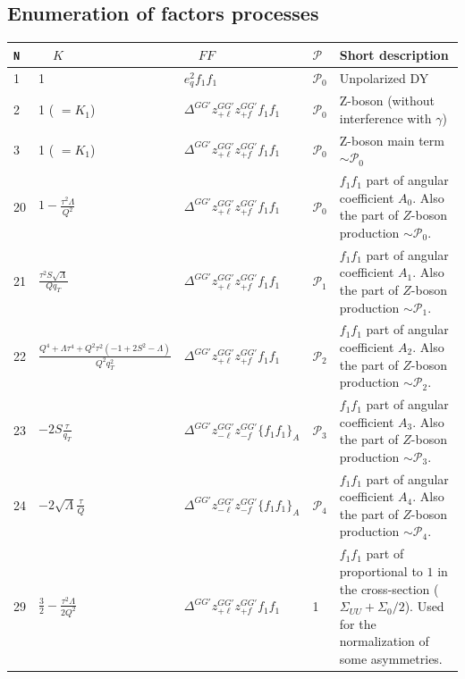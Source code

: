 \documentclass[prd,nofootinbib,eqsecnum,final]{revtex4}
\renewcommand{\(}{\left(}
\renewcommand{\)}{\right)}
\renewcommand{\[}{\left[}
\renewcommand{\]}{\right]}
\newcommand{\blue}[1]{{\color{blue} #1}}
\begin{document}
\subsection{Enumeration of factors processes}

\begin{longtable}{||l|p{5cm}|p{5cm}|p{1cm}|p{4cm}||}
\hline\hline
\texttt{N} & ~~$K$~~& ~~$FF$~~ & $\mathcal{P}$ & Short description 
\\\hline
1 & 1 & $e_q^2 f_1 f_1$ & $\mathcal{P}_0$ & Unpolarized DY 
\\\hline
2 & 1 (\blue{$=K_1$}) & $ \Delta^{GG'} z^{GG'}_{+\ell}z^{GG'}_{+f} f_1 f_1$ & $\mathcal{P}_0$ & Z-boson (without interference with $\gamma$)
\\\hline
3 & 1 (\blue{$=K_1$}) & $ \Delta^{GG'} z^{GG'}_{+\ell}z^{GG'}_{+f} f_1 f_1$ & $\mathcal{P}_0$ & Z-boson main term $\sim \mathcal{P}_0$
\\\hline\hline
20 & $1-\frac{\tau^2 \Lambda}{Q^2}$ & $ \Delta^{GG'} z^{GG'}_{+\ell}z^{GG'}_{+f} f_1 f_1$ & $\mathcal{P}_0$ & $f_1f_1$ part of angular coefficient $A_0$. Also the part of $Z$-boson production $\sim \mathcal{P}_0$.
\\\hline
21 & $\frac{\tau^2 S\sqrt{\Lambda}}{Q q_T}$ & $ \Delta^{GG'} z^{GG'}_{+\ell}z^{GG'}_{+f} f_1 f_1$ & $\mathcal{P}_1$ & $f_1f_1$ part of angular coefficient $A_1$. Also the part of $Z$-boson production $\sim \mathcal{P}_1$.
\\\hline
22 & $\frac{Q^4+\Lambda \tau^4+Q^2\tau^2(-1+2S^2-\Lambda)}{Q^2 q^2_T}$ & $ \Delta^{GG'} z^{GG'}_{+\ell}z^{GG'}_{+f} f_1 f_1$ & $\mathcal{P}_2$ & $f_1f_1$ part of angular coefficient $A_2$. Also the part of $Z$-boson production $\sim \mathcal{P}_2$.
\\\hline
23 & $-2S\frac{\tau}{q_T}$ & $ \Delta^{GG'} z^{GG'}_{-\ell}z^{GG'}_{-f} \{f_1 f_1\}_A$ & $\mathcal{P}_3$ & $f_1f_1$ part of angular coefficient $A_3$. Also the part of $Z$-boson production $\sim \mathcal{P}_3$.
\\\hline
24 & $-2\sqrt{\Lambda}\frac{\tau}{Q}$ & $ \Delta^{GG'} z^{GG'}_{-\ell}z^{GG'}_{-f} \{f_1 f_1\}_A$ & $\mathcal{P}_4$ & $f_1f_1$ part of angular coefficient $A_4$. Also the part of $Z$-boson production $\sim \mathcal{P}_4$.
\\\hline
29 & $\frac{3}{2}-\frac{\tau^2 \Lambda}{2Q^2}$ & $ \Delta^{GG'} z^{GG'}_{+\ell}z^{GG'}_{+f} f_1 f_1$ & 1 & $f_1f_1$ part of proportional to $1$ in the cross-section ($\Sigma_{UU}+\Sigma_{0}/2$). Used for the normalization of some asymmetries.
\\\hline

\end{longtable}
\end{document}
